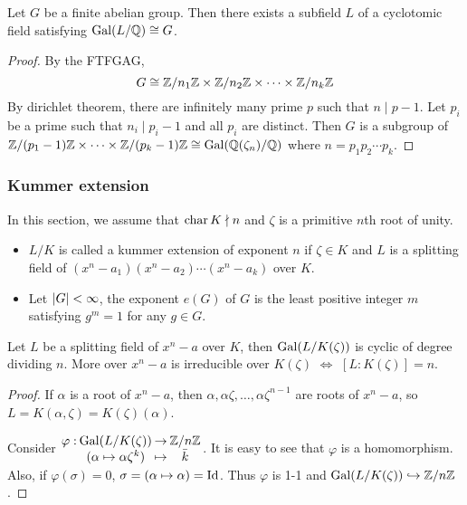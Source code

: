 \begin{theorem}
  Let $G$ be a finite abelian group. Then there exists a subfield $L$ of
  a cyclotomic field satisfying $\operatorname{Gal}(L / \mathbb{Q}) \cong G$.

  \begin{proof}
    By the FTFGAG,
    \[ G \cong \mathbb{Z} / n_1 \mathbb{Z} \times \mathbb{Z} / n_2 \mathbb{Z} \times \dots \times \mathbb{Z} / n_k \mathbb{Z} \]
    By dirichlet theorem, there are infinitely many prime $p$ such that $n \mid p - 1$.
    Let $p_i$ be a prime such that $n_i \mid p_i - 1$ and all $p_i$ are distinct.
    Then $G$ is a subgroup of $\mathbb{Z} / (p_1 - 1) \mathbb{Z} \times \dots \times \mathbb{Z} / (p_k - 1) \mathbb{Z} \cong \operatorname{Gal}(\mathbb{Q}(\zeta_n) / \mathbb{Q})$
    where $n = p_1 p_2 \dotsm p_k$.
  \end{proof}
\end{theorem}

\subsubsection{Kummer extension}
In this section, we assume that $\operatorname{char} K \nmid n$ and $\zeta$ is a primitive $n$th root of unity.

\begin{definition} \hfill
  \begin{itemize}
    \item $L/K$ is called a kummer extension of exponent $n$ if $\zeta \in K$ and $L$ is a splitting field
      of $(x^n - a_1) (x^n - a_2) \dotsm (x^n - a_k)$ over $K$.
    \item Let $\lvert G\rvert < \infty$, the exponent $e(G)$ of $G$ is the least positive integer $m$
      satisfying $g^m = 1$ for any $g \in G$.
  \end{itemize}
\end{definition}

\begin{theorem}
  Let $L$ be a splitting field of $x^n - a$ over $K$, then $\operatorname{Gal}(L / K(\zeta))$ is cyclic of
  degree dividing $n$. More over $x^n - a$ is irreducible over $K(\zeta)$ $\iff$ $[L: K(\zeta)] = n$.

  \begin{proof}
    If $\alpha$ is a root of $x^n - a$, then $\alpha, \alpha \zeta, \dots, \alpha \zeta^{n-1}$
    are roots of $x^n - a$, so $L = K(\alpha, \zeta) = K(\zeta)(\alpha)$.

    Consider $\deffunc{\varphi}{\Gal(L / K(\zeta))}{\Zb / n\Zb}{(\alpha \mapsto \alpha \zeta^k)}{\bar{k}}$.
    It is easy to see that $\varphi$ is a homomorphism. Also, if $\varphi(\sigma) = 0$,
    $\sigma = (\alpha \mapsto \alpha) = {\rm Id}$. Thus $\varphi$ is 1-1 and
    $\operatorname{Gal}(L / K(\zeta)) \hookrightarrow {\mathbb{Z}}/{n\mathbb{Z}}$.
  \end{proof}
\end{theorem}

